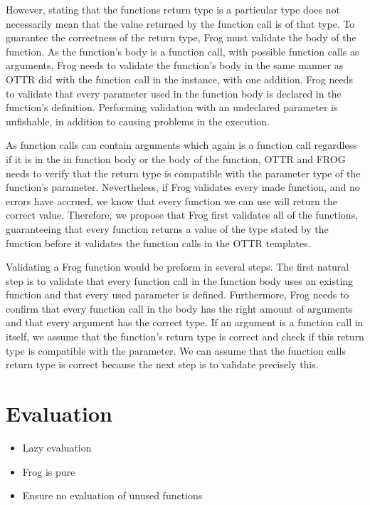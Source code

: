 \para
However, stating that the functions return type is a particular type does not necessarily mean that the value returned by the function call is of that type. To guarantee the correctness of the return type, Frog must validate the body of the function. As the function's body is a function call, with possible function calls as arguments, Frog needs to validate the function's body in the same manner as OTTR did with the function call in the instance, with one addition. Frog needs to validate that every parameter used in the function body is declared in the function's definition. Performing validation with an undeclared parameter is unfishable, in addition to causing problems in the execution. 

\para
As function calls can contain arguments which again is a function call regardless if it is in the in function body or the body of the function, OTTR and FROG needs to verify that the return type is compatible with the parameter type of the function's parameter. Nevertheless, if Frog validates every made function, and no errors have accrued, we know that every function we can use will return the correct value. Therefore, we propose that Frog first validates all of the functions, guaranteeing that every function returns a value of the type stated by the function before it validates the function calls in the OTTR templates. 

\para
Validating a Frog function would be preform in several steps. The first natural step is to validate that every function call in the function body uses an existing function and that every used parameter is defined. Furthermore, Frog needs to confirm that every function call in the body has the right amount of arguments and that every argument has the correct type. If an argument is a function call in itself, we assume that the function's return type is correct and check if this return type is compatible with the parameter. We can assume that the function calls return type is correct because the next step is to validate precisely this. 

\section{Evaluation}
\begin{itemize}
    \item Lazy evaluation
    \item Frog is pure 
    \item Ensure no evaluation of unused functions 
\end{itemize}


